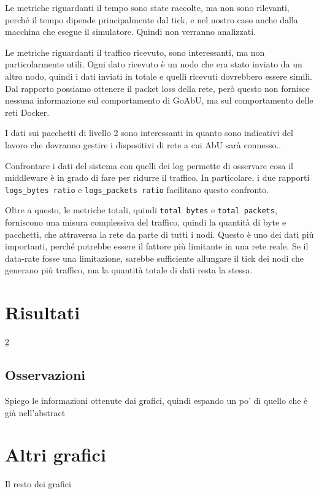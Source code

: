 \documentclass[12pt, a4paper]{article}
\begin{document}
Le metriche riguardanti il tempo sono state raccolte, ma non sono rilevanti, perché il tempo dipende principalmente dal tick, e nel nostro caso anche dalla macchina che esegue il simulatore. Quindi non verranno analizzati.

Le metriche riguardanti il traffico ricevuto, sono interessanti, ma non particolarmente utili. Ogni dato ricevuto è un nodo che era stato inviato da un altro nodo, quindi i dati inviati in totale e quelli ricevuti dovrebbero essere simili.
Dal rapporto possiamo ottenere il packet loss della rete, però questo non fornisce nessuna informazione sul comportamento di GoAbU, ma sul comportamento delle reti Docker.

I dati sui pacchetti di livello 2 sono interessanti in quanto sono indicativi del lavoro che dovranno gestire i dispositivi di rete a cui AbU sarà connesso..

Confrontare i dati del sistema con quelli dei log permette di osservare cosa il middleware è in grado di fare per ridurre il traffico. In particolare, i due rapporti \lstinline{logs_bytes ratio} e \lstinline{logs_packets ratio} facilitano questo confronto.

Oltre a questo, le metriche totali, quindi \lstinline{total bytes} e \lstinline{total packets}, forniscono una misura complessiva del traffico, quindi la quantità di byte e pacchetti, che attraversa la rete da parte di tutti i nodi.
Questo è uno dei dati più importanti, perché potrebbe essere il fattore più limitante in una rete reale. Se il data-rate fosse una limitazione, sarebbe sufficiente allungare il tick dei nodi che generano più traffico, ma la quantità totale di dati resta la stessa.

\section{Risultati}



\ref{appendix:grafici}

\subsection{Osservazioni}

Spiego le informazioni ottenute dai grafici, quindi espando un po' di quello che è già nell'abstract \\




\appendix

\section{Altri grafici}\label{appendix:grafici}

Il resto dei grafici
\end{document}
